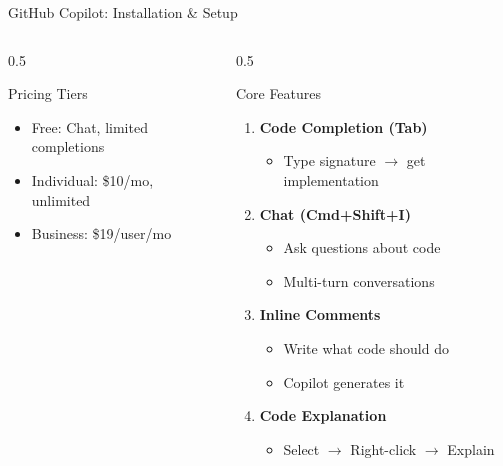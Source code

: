 \documentclass[aspectratio=169,11pt]{beamer}
\begin{document}
\begin{frame}{GitHub Copilot: Installation \& Setup}
\begin{columns}[T]
\begin{column}{0.5\textwidth}
            \begin{block}{Pricing Tiers}
                \small
                \begin{itemize}
                    \item Free: Chat, limited completions
                    \item Individual: \$10/mo, unlimited
                    \item Business: \$19/user/mo
                \end{itemize}
            \end{block}
        \end{column}
        \begin{column}{0.5\textwidth}
            \begin{exampleblock}{Core Features}
                \begin{enumerate}
                    \item \textbf{Code Completion (Tab)}
                    \begin{itemize}
                        \item Type signature $\rightarrow$ get implementation
                    \end{itemize}
                    \item \textbf{Chat (Cmd+Shift+I)}
                    \begin{itemize}
                        \item Ask questions about code
                        \item Multi-turn conversations
                    \end{itemize}
                    \item \textbf{Inline Comments}
                    \begin{itemize}
                        \item Write what code should do
                        \item Copilot generates it
                    \end{itemize}
                    \item \textbf{Code Explanation}
                    \begin{itemize}
                        \item Select $\rightarrow$ Right-click $\rightarrow$ Explain
                    \end{itemize}
                \end{enumerate}
            \end{exampleblock}


\end{column}
\end{columns}
\end{frame}
\end{document}
